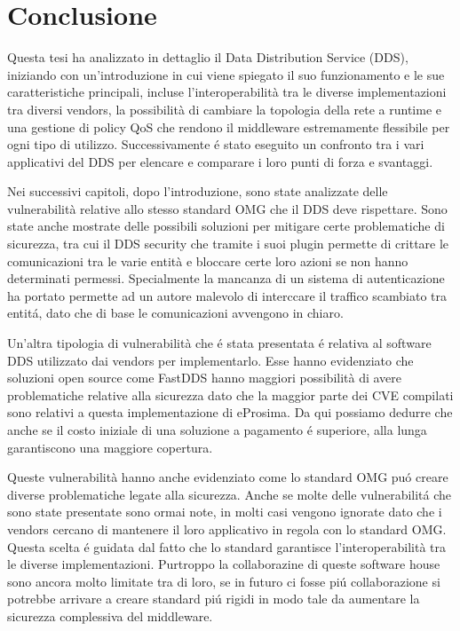 \chapter{Conclusione}
Questa tesi ha analizzato in dettaglio il Data Distribution Service (DDS),
iniziando con un'introduzione in cui viene spiegato il suo funzionamento 
e le sue caratteristiche principali, incluse l'interoperabilità tra 
le diverse implementazioni tra diversi vendors, la possibilità di 
cambiare la topologia della rete a runtime e una gestione di policy 
QoS che rendono il middleware estremamente flessibile per ogni tipo 
di utilizzo. Successivamente é stato eseguito un confronto tra i 
vari applicativi del DDS per elencare e comparare i loro 
punti di forza e svantaggi.

Nei successivi capitoli, dopo l'introduzione, sono state 
analizzate 
delle vulnerabilità relative allo stesso standard OMG che il 
DDS deve rispettare. Sono state anche mostrate delle
possibili soluzioni per mitigare certe problematiche di
sicurezza, tra cui il DDS security che tramite i suoi plugin 
permette di crittare le comunicazioni tra le varie entità e 
bloccare certe loro azioni se non hanno determinati permessi.
Specialmente la mancanza di un sistema di autenticazione 
ha portato permette ad un autore malevolo di interccare 
il traffico scambiato tra entitá, dato che di base le 
comunicazioni avvengono in chiaro.  

Un'altra tipologia di vulnerabilità che é stata presentata é 
relativa al software DDS utilizzato dai vendors per 
implementarlo. Esse hanno evidenziato che 
soluzioni open source come FastDDS hanno maggiori possibilità 
di avere problematiche relative alla sicurezza dato che
la maggior parte dei CVE compilati sono relativi a questa 
implementazione di eProsima. Da qui possiamo dedurre che 
anche se il costo iniziale di una soluzione a pagamento 
é superiore, alla lunga garantiscono una maggiore copertura.

Queste vulnerabilità hanno anche
evidenziato 
come lo standard OMG puó creare diverse problematiche 
legate alla sicurezza. 
Anche se molte delle vulnerabilitá che sono state presentate 
sono ormai note, in molti casi vengono ignorate 
dato che i vendors cercano di mantenere il loro applicativo 
in regola con lo standard OMG. Questa scelta é guidata dal fatto che 
lo standard garantisce l'interoperabilità tra le diverse implementazioni. 
Purtroppo la collaborazine di queste software house sono ancora 
molto limitate tra di loro, se in futuro ci fosse piú collaborazione 
si potrebbe arrivare a creare standard piú rigidi in modo tale
da aumentare la sicurezza complessiva del middleware.

